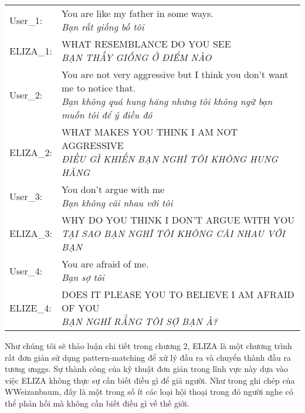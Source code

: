 \vspace{0.15cm}
\hspace*{-1cm}
\colorbox{background}{
\begin{tabular}{ l l }
  User_1: & \makecell[l]{You are like my father in some ways. \vspace{-0.15cm} \\
    \scriptsize{\textit{Bạn rất giống bố tôi}}}  \\
  ELIZA_1: & \makecell[l]{WHAT RESEMBLANCE DO YOU SEE \vspace{-0.15cm} \\
    \scriptsize{\textit{BẠN THẤY GIỐNG Ở ĐIỂM NÀO}}} \\
  User_2: & \makecell[l]{You are not very aggressive but I think you don't want me to notice that. \vspace{-0.15cm} \\
    \scriptsize{\textit{Bạn không quá hung hăng nhưng tôi không ngữ bạn muốn tôi để ý điều đó }}} \\
  ELIZA_2: & \makecell[l]{WHAT MAKES YOU THINK I AM NOT AGGRESSIVE \vspace{-0.15cm} \\
    \scriptsize{\textit{ĐIỀU GÌ KHIẾN BẠN NGHĨ TÔI KHÔNG HUNG HĂNG}}} \\
  User_3: & \makecell[l]{You don't argue with me \vspace{-0.15cm} \\
    \scriptsize{\textit{Bạn không cãi nhau với tôi}}} \\
  ELIZA_3: & \makecell[l]{WHY DO YOU THINK I DON'T ARGUE WITH YOU \vspace{-0.15cm} \\
    \scriptsize{\textit{TẠI SAO BẠN NGHĨ TÔI KHÔNG CÃI NHAU VỚI BẠN}}} \\
  User_4: & \makecell[l]{You are afraid of me. \vspace{-0.15cm} \\
    \scriptsize{\textit{Bạn sợ tôi}}} \\
  ELIZE_4: & \makecell[l]{DOES IT PLEASE YOU TO BELIEVE I AM AFRAID OF YOU \vspace{-0.15cm} \\
    \scriptsize{\textit{BẠN NGHĨ RẰNG TÔI SỢ BẠN À?}}}
\end{tabular}
}


Như chúng tôi sẽ thảo luận chi tiết trong chương 2, ELIZA là một chương trình rất đơn giản sử dụng pattern-matching để xử lý đầu ra và chuyển thành đầu ra tương ưnggs. Sự thành công của kỹ thuật đơn giản trong lĩnh vực này dựa vào việc ELIZA không thực sự cần biết điều gì để giả người. Như trong ghi chép của WWeizanbaum, đây là một trong số ít các loại hội thoại trong đó người nghe có thể phản hồi mà không cần biết điều gì về thế giới.

